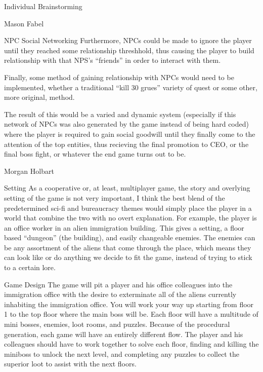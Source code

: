 \documentclass[12pt]{report}
\begin{document}
\begin{section}{Individual Brainstorming}
\begin{subsection}{Mason Fabel}
\begin{subsubsection}{NPC Social Networking}
Furthermore, NPCs could be made to ignore the player until they reached
some relationship threshhold, thus causing the player to build relationship
with that NPS's ``friends'' in order to interact with them.

Finally, some method of gaining relationship with NPCs would need to be
implemented, whether a traditional ``kill 30 grues'' variety of quest or
some other, more original, method.

The result of this would be a varied and dynamic system (especially if this
network of NPCs was also generated by the game instead of being hard coded)
where the player is required to gain social goodwill until they finally
come to the attention of the top entities, thus recieving the final
promotion to CEO, or the final boss fight, or whatever the end game turns
out to be.
\end{subsubsection}
\end{subsection}

\begin{subsection}{Morgan Holbart}
\begin{subsubsection}{Setting}
As a cooperative or, at least, multiplayer game, the story and overlying
setting of the game is not very important, I think the best blend of the
predetermined sci-fi and bureaucracy themes would simply place the player
in a world that combine the two with no overt explanation. For example,
the player is an office worker in an alien immigration building.
This gives a setting, a floor based ``dungeon'' (the building), and easily
changeable enemies. The enemies can be any assortment of the aliens that
come through the place, which means they can look like or do anything we
decide to fit the game, instead of trying to stick to a certain lore.
\end{subsubsection}

\begin{subsubsection}{Game Design}
The game will pit a player and his office colleagues into the immigration
office with the desire to exterminate all of the aliens currently inhabiting
the immigration office. You will work your way up starting from floor 1 to
the top floor where the main boss will be. Each floor will have a multitude
of mini bosses, enemies, loot rooms, and puzzles. Because of the procedural
generation, each game will have an entirely different flow. The player and
his colleagues should have to work together to solve each floor, finding and
killing the miniboss to unlock the next level, and completing any puzzles
to collect the superior loot to assist with the next floors.


\end{subsubsection}
\end{subsection}
\end{section}
\end{document}
